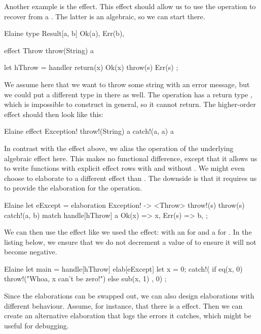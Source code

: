 Another example is the  effect. This effect should allow us to use the  operation to recover from a . The latter is an algebraic, so we can start there.

\begin{lst}{Elaine}
type Result[a, b] {
    Ok(a),
    Err(b),
}

effect Throw {
    throw(String) a
}

let hThrow = handler {
    return(x) { Ok(x) }
    throw(s) { Err(s) }
};
\end{lst}
%
We assume here that we want to throw some string with an error message, but we could put a different type in there as well. The  operation has a return type , which is impossible to construct in general, so it cannot return. The higher-order  effect should then look like this:

\begin{lst}{Elaine}
effect Exception! {
    throw!(String) a
    catch!(a, a) a
}
\end{lst}
%
In contrast with the  effect above, we alias the operation of the underlying algebraic effect here. This makes no functional difference, except that it allows us to write functions with explicit effect rows with  and without . We might even choose to elaborate to a different effect than . The downside is that it requires us to provide the elaboration for the  operation.

\begin{lst}{Elaine}
let eExcept = elaboration Exception! -> <Throw> {
    throw!(s) { throw(s) }
    catch!(a, b) {
        match handle[hThrow] a {
            Ok(x) => x,
            Err(s) => b,
        }
    }
};
\end{lst}
%
We can then use the  effect like we used the  effect: with an  for  and a  for . In the listing below, we ensure that we do not decrement a value of  to ensure it will not become negative.

\begin{lst}{Elaine}
let main = handle[hThrow] elab[eExcept] {
    let x = 0;
    catch!({
        if eq(x, 0) {
            throw!("Whoa, x can't be zero!")
        } else {
            sub(x, 1) 
        }
    }, 0)
};
\end{lst}
%
Since the elaborations can be swapped out, we can also design elaborations with different behaviour. Assume, for instance, that there is a  effect. Then we can create an alternative elaboration that logs the errors it catches, which might be useful for debugging.

